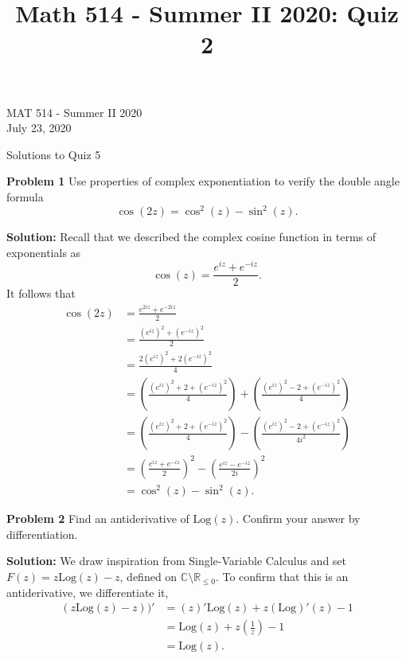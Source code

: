 \documentclass[12pt,oneside]{exam}
\title{Math 514 - Summer II 2020: Quiz 2}
\newenvironment{exercise}[1]{\vspace{.1in}\noindent\textbf{Problem #1 \hspace{.05em}}}{}
\begin{document}
\begin{flushright}
\sc MAT 514 - Summer II 2020\\
July 23, 2020
\end{flushright}
\bigskip
 
\begin{center}
\textsf{Solutions to Quiz 5} 
\end{center}


\begin{exercise}{1}
Use properties of complex exponentiation to verify the double angle formula
\begin{equation*}
\cos(2z) = \cos^2(z)-\sin^2(z).
\end{equation*}
\end{exercise}
\vspace{0.5cm}

\noindent \textbf{Solution:} Recall that we described the complex cosine function in terms of exponentials as
\begin{equation*}
\cos(z) = \frac{e^{iz}+e^{-iz}}{2}.
\end{equation*}
It follows that 
\begin{align*}
\cos(2z) & = \frac{e^{2iz}+e^{-2iz}}{2} \\
& = \frac{(e^{iz})^2+(e^{-iz})^2}{2}\\
& = \frac{2(e^{iz})^2+2(e^{-iz})^2}{4}\\
& = \left(\frac{(e^{iz})^2+2+(e^{-iz})^2}{4}\right) + \left(\frac{(e^{iz})^2-2+(e^{-iz})^2}{4}\right)\\
& = \left(\frac{(e^{iz})^2+2+(e^{-iz})^2}{4}\right) -\left(\frac{(e^{iz})^2-2+(e^{-iz})^2}{4i^2}\right)\\
& = \left(\frac{e^{iz}+e^{-iz}}{2}\right)^2 - \left( \frac{e^{iz}-e^{-iz}}{2i}\right)^2 \\
& = \cos^2(z)-\sin^2(z).
\end{align*}

\vfill
\begin{exercise}{2}
Find an antiderivative of $\mathrm{Log}(z)$. Confirm your answer by differentiation.
\end{exercise}

\vspace{0.5cm}

\noindent \textbf{Solution:} We draw inspiration from Single-Variable Calculus and set $F(z) = z\mathrm{Log}(z)-z$, defined on $\mathbb{C}\setminus \mathbb{R}_{\leq 0}$. To confirm that this is an antiderivative, we differentiate it, 
\begin{align*}
(z\mathrm{Log}(z) -z))' & = (z)'\mathrm{Log}(z) + z(\mathrm{Log})'(z)-1\\
& = \mathrm{Log}(z)+z\left(\frac{1}{z}\right) -1 \\
& = \mathrm{Log}(z).
\end{align*}
\vfill
\end{document}
